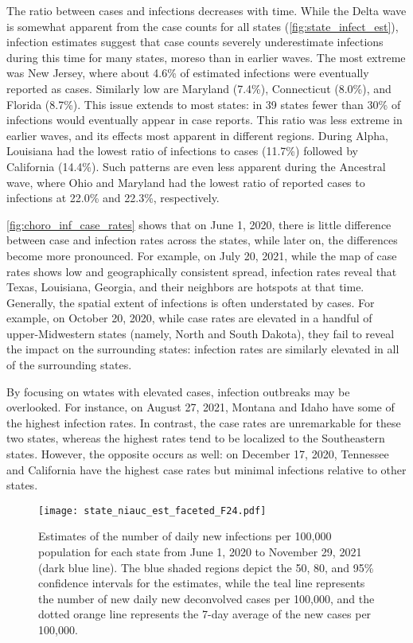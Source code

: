 The ratio between cases and infections decreases with time. While the Delta wave
is somewhat apparent from the case counts for all states
(\autoref{fig:state_infect_est}), infection estimates suggest that case counts
severely underestimate infections during this time for many states, moreso than
in earlier waves. The most extreme was New Jersey, where about 4.6\% of
estimated infections were eventually reported as cases. Similarly low are
Maryland (7.4\%), Connecticut (8.0\%), and Florida (8.7\%). This issue extends
to most states: in 39 states fewer than 30\% of infections would eventually
appear in case reports. This ratio was less extreme in earlier waves, and its
effects most apparent in different regions. During Alpha, Louisiana had the
lowest ratio of infections to cases (11.7\%) followed by California (14.4\%).
Such patterns are even less apparent during the Ancestral wave, where Ohio and
Maryland had the lowest ratio of reported cases to infections at 22.0\%  and
22.3\%, respectively. 

\autoref{fig:choro_inf_case_rates} shows that on June 1, 2020, there is little
difference between case and infection rates across the states, while
later on, the differences become more pronounced.
For example, on July 20, 2021, while the map of case rates shows low and
geographically consistent spread, infection rates reveal that Texas, Louisiana,
Georgia, and their neighbors are hotspots at that time. Generally, the spatial
extent of infections is often understated by cases. For example, on October 20,
2020, while case rates are elevated in a handful of upper-Midwestern states
(namely, North and South Dakota), they fail to reveal the impact on the
surrounding states: infection rates are similarly elevated in all of the
surrounding states. 

By focusing on wtates with elevated cases, infection outbreaks may be
overlooked. For instance, on August 27, 2021, Montana and Idaho have some of the
highest infection rates. In contrast, the case rates are unremarkable for these
two states, whereas the highest rates tend to be localized to the Southeastern
states. However, the opposite occurs as well: on December
17, 2020, Tennessee and California have the highest case rates but minimal
infections relative to other states.

\begin{figure}[!tb]
\centering
\texttt{[image: state\_niauc\_est\_faceted\_F24.pdf]} 
\caption{Estimates of the number of daily new infections per 100,000
population for each \US state from June 1, 2020 to November 29, 2021
(dark blue line). The blue shaded regions depict the 50, 80, and 95\%
confidence intervals for the estimates, while the teal line represents
the number of new daily new deconvolved cases per 100,000, and the
dotted orange line represents the 7-day average of the new cases per
100,000.}
\label{fig:state_infect_est}
\end{figure}


